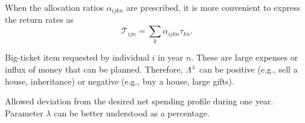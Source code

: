\documentclass{report}[fleqn,11pt]
\begin{document}
\begin{description}[leftmargin=4em,style=multiline]
\item[$\mathcal{T}_{ijn}$]
	When the allocation ratios $\alpha_{ijkn}$ are prescribed,
	it is more convenient to express the return rates as
	\begin{equation}
		\mathcal{T}_{ijn} = \sum_k \alpha_{ijkn} \tau_{kn}.
	\end{equation}

\item [$\Lambda^\pm_{in}$]
	Big-ticket item requested by individual $i$ in year $n$.
	These are large expenses or influx of money
	that can be planned. Therefore, $\Lambda^\pm$ can be positive
	(e.g., sell a house, inheritance) or negative (e.g., buy a house, large gifts).
\item [$\lambda$]
        Allowed deviation from the desired net spending profile during one year. Parameter
        $\lambda$ can be better understood as a percentage.


\end{description}
\end{document}
